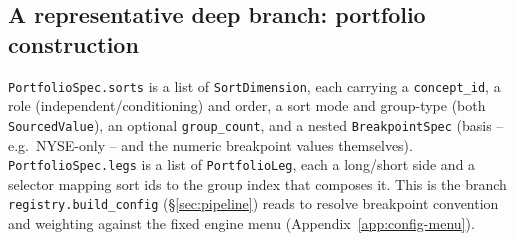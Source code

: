 \subsection{A representative deep branch: portfolio construction}

\texttt{PortfolioSpec.sorts} is a list of \texttt{SortDimension}, each
carrying a \texttt{concept\_id}, a role (independent/conditioning) and order,
a sort mode and group-type (both \texttt{SourcedValue}), an optional
\texttt{group\_count}, and a nested \texttt{BreakpointSpec} (basis --
e.g.\ NYSE-only -- and the numeric breakpoint values themselves).
\texttt{PortfolioSpec.legs} is a list of \texttt{PortfolioLeg}, each a
long/short side and a selector mapping sort ids to the group index that
composes it. This is the branch \texttt{registry.build\_config}
(\S\ref{sec:pipeline}) reads to resolve breakpoint convention and weighting
against the fixed engine menu (Appendix~\ref{app:config-menu}).
